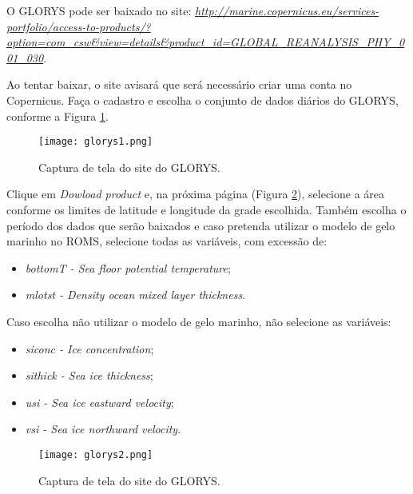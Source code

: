 \noindent O GLORYS pode ser baixado no site: \textcolor{bleu_cite}{\href{http://marine.copernicus.eu/services-portfolio/access-to-products/?option=com\_csw\&view=details\&product\_id=GLOBAL\_REANALYSIS\_PHY\_001\_030}{\textit{http://marine.copernicus.eu/services-portfolio/access-to-products/?option=com\_csw\&view=details\&product\_id=GLOBAL\_REANALYSIS\_PHY\_001\_030}}}.
\bigskip

\noindent Ao tentar baixar, o site avisará que será necessário criar uma conta no Copernicus. Faça o cadastro e escolha o conjunto de dados diários do GLORYS, conforme a Figura \textcolor{bleu_cite}{\ref{glorys1}}.
\bigskip

\begin{figure}[H]
    \centering
    \texttt{[image: glorys1.png]}
    \caption{Captura de tela do site do GLORYS.}
    \label{glorys1}
\end{figure}
\bigskip

\noindent Clique em \textit{Dowload product} e, na próxima página (Figura \textcolor{bleu_cite}{\ref{glorys2}}), selecione a área conforme os limites de latitude e longitude da grade escolhida. Também escolha o período dos dados que serão baixados e caso pretenda utilizar o modelo de gelo marinho no ROMS, selecione todas as variáveis, com excessão de: 
\bigskip
\begin{itemize}
    \item \textit{ bottomT - Sea floor potential temperature};
    \item \textit{mlotst - Density ocean mixed layer thickness}.
\end{itemize}
\bigskip

\noindent Caso escolha não utilizar o modelo de gelo marinho, não selecione as variáveis:
\bigskip

\begin{itemize}
    \item \textit{siconc - Ice concentration};
    \item \textit{sithick - Sea ice thickness};
    \item \textit{usi - Sea ice eastward velocity};
    \item \textit{vsi - Sea ice northward velocity}.
\end{itemize}
\bigskip

\begin{figure}[H]
    \centering
    \texttt{[image: glorys2.png]}
    \caption{Captura de tela do site do GLORYS.}
    \label{glorys2}
\end{figure}
\bigskip

